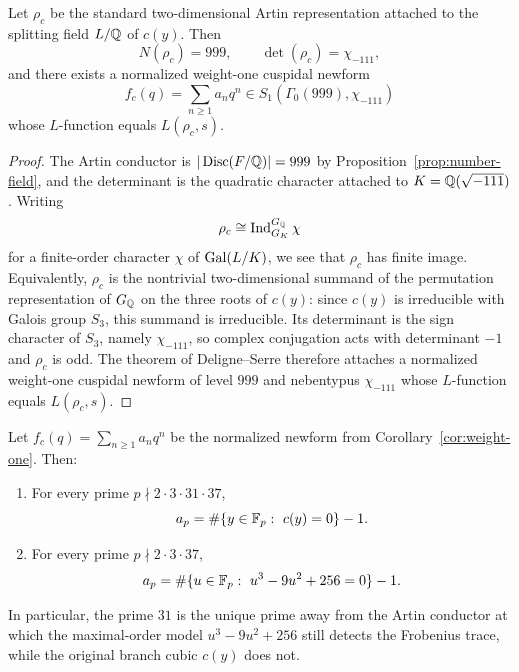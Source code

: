 \begin{corollary}\label{cor:weight-one}
Let \(\rho_c\) be the standard two-dimensional Artin representation attached to the splitting field \(L/\mathbb{Q}\) of \(c(y)\). Then
\[
N(\rho_c)=999,
\qquad
\det(\rho_c)=\chi_{-111},
\]
and there exists a normalized weight-one cuspidal newform
\[
f_c(q)=\sum_{n\geq 1} a_n q^n\in S_1(\Gamma_0(999),\chi_{-111})
\]
whose \(L\)-function equals \(L(\rho_c,s)\).
\end{corollary}

\begin{proof}
The Artin conductor is \(|\operatorname{Disc}(F/\mathbb{Q})|=999\) by Proposition~\ref{prop:number-field}, and the determinant is the quadratic character attached to \(K=\mathbb{Q}(\sqrt{-111})\). Writing
\[
\rho_c\cong \operatorname{Ind}_{G_K}^{G_{\mathbb{Q}}}\chi
\]
for a finite-order character \(\chi\) of \(\operatorname{Gal}(L/K)\), we see that \(\rho_c\) has finite image. Equivalently, \(\rho_c\) is the nontrivial two-dimensional summand of the permutation representation of \(G_{\mathbb{Q}}\) on the three roots of \(c(y)\): since \(c(y)\) is irreducible with Galois group \(S_3\), this summand is irreducible. Its determinant is the sign character of \(S_3\), namely \(\chi_{-111}\), so complex conjugation acts with determinant \(-1\) and \(\rho_c\) is odd. The theorem of Deligne--Serre \cite{DeligneSerre1974WeightOne} therefore attaches a normalized weight-one cuspidal newform of level \(999\) and nebentypus \(\chi_{-111}\) whose \(L\)-function equals \(L(\rho_c,s)\).
\end{proof}

\begin{theorem}\label{thm:hecke-traces}
Let \(f_c(q)=\sum_{n\geq 1} a_n q^n\) be the normalized newform from Corollary~\ref{cor:weight-one}. Then:
\begin{enumerate}
\item[(i)] For every prime \(p\nmid 2\cdot 3\cdot 31\cdot 37\),
\[
a_p=\#\{y\in \F_p:\ c(y)=0\}-1.
\]
\item[(ii)] For every prime \(p\nmid 2\cdot 3\cdot 37\),
\[
a_p=\#\{u\in \F_p:\ u^3-9u^2+256=0\}-1.
\]
\end{enumerate}
In particular, the prime \(31\) is the unique prime away from the Artin conductor at which the maximal-order model \(u^3-9u^2+256\) still detects the Frobenius trace, while the original branch cubic \(c(y)\) does not.
\end{theorem}


